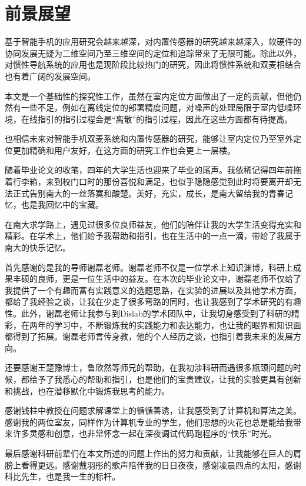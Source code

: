 \documentclass[winfonts,oneside]{njuthesis}
\begin{document}
	\section{前景展望}
	
		基于智能手机的应用研究会越来越深，对内置传感器的研究越来越深入，软硬件的协同发展无疑为二维空间乃至三维空间的定位和追踪带来了无限可能。除此以外，对惯性导航系统的应用也是现阶段比较热门的研究，因此将惯性系统和双麦相结合也有着广阔的发展空间。
		
		本文是一个基础性的探究性工作，虽然在室内定位方面做出了一定的贡献，但他仍然有一些不足，例如在离线定位的部署精度问题，对噪声的处理局限于室内低噪环境，在线指引的指引过程会是“离散”的指引过程，因此在这些方面都有待提高。
		
		也相信未来对智能手机双麦系统和内置传感器的研究，能够让室内定位乃至室外定位更加精确和用户友好，在这方面的研究工作也会更上一层楼。
	
	

	\begin{acknowledgement}
		
		随着毕业论文的收笔，四年的大学生活也迎来了毕业的尾声。我依稀记得四年前拖着行李箱，来到校门口时的那份喜悦和满足，也似乎隐隐感觉到此时将要离开却无法正式告别南大的一丝落寞和酸楚。美好，充实，成长，是南大留给我的青春记忆，也是我回忆中的宝藏。
		
		在南大求学路上，遇见过很多位良师益友，他们的陪伴让我的大学生活变得充实和精彩。在学术上，他们给予我帮助和指引，也在生活中的一点一滴，带给了我属于南大的快乐记忆。
		
		首先感谢的是我的导师谢磊老师。谢磊老师不仅是一位学术上知识渊博，科研上成果丰硕的良师，更是一位生活中的益友。在本次的毕业论文中，谢磊老师不仅给了我提供了一个有趣而富有实践意义的选题思路，在实验的进展以及其他学术方面，都给了我经验之谈，让我在少走了很多弯路的同时，也让我感到了学术研究的有趣性。此外，谢磊老师让我参与到Dislab的学术团队中，让我切身感受到了科研的精彩，在两年的学习中，不断锻炼我的实践能力和表达能力，也让我的眼界和知识面都得到了拓展。谢磊老师言传身教，他的个人经历之谈，也指引着我未来的发展方向。
		
		还要感谢王楚豫博士，鲁欣然等师兄的帮助，在我初涉科研而遇很多瓶颈问题的时候，都给予了我悉心的帮助和指引，也是他们的宝贵建议，让我的实验更具有创新和挑战，也在潜移默化中锻炼我思考的能力。
		
		感谢钱柱中教授在问题求解课堂上的循循善诱，让我感受到了计算机和算法之美。感谢我的两位室友，同样作为计算机专业的学生，他们思想的火花也总是能给我带来许多灵感和创意，也非常怀念一起在深夜调试代码跑程序的“快乐”时光。
		
		最后感谢科研前辈们在本文所述的问题上作出的努力和贡献，让我能够在巨人的肩膀上看得更远。感谢戴羽彤的歌声陪伴我的日日夜夜，感谢凌晨四点的太阳，感谢科比先生，也是我一生的标杆。
		
	\end{acknowledgement}
\end{document}
